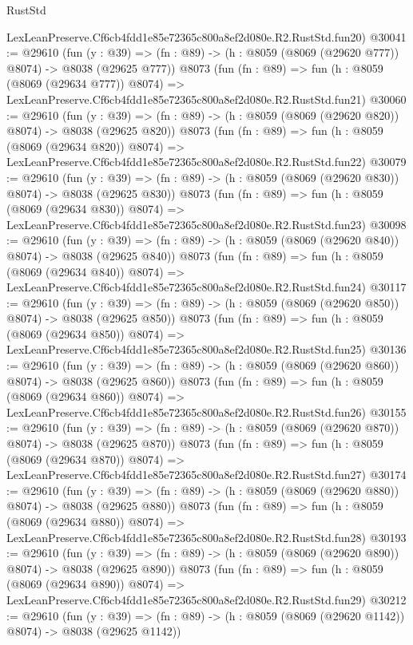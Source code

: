 \begin{lexlean}{RustStd}
\begin{coremodule}
    LexLeanPreserve.Cf6cb4fdd1e85e72365c800a8ef2d080e.R2.RustStd.fun20)
@30041 := @29610
    (fun (y : @39) => (fn : @89) -> (h : @8059 (@8069 (@29620 @777)) @8074) -> @8038 (@29625 @777))
    @8073
    (fun (fn : @89) =>
    fun (h : @8059 (@8069 (@29634 @777)) @8074) =>
    LexLeanPreserve.Cf6cb4fdd1e85e72365c800a8ef2d080e.R2.RustStd.fun21)
@30060 := @29610
    (fun (y : @39) => (fn : @89) -> (h : @8059 (@8069 (@29620 @820)) @8074) -> @8038 (@29625 @820))
    @8073
    (fun (fn : @89) =>
    fun (h : @8059 (@8069 (@29634 @820)) @8074) =>
    LexLeanPreserve.Cf6cb4fdd1e85e72365c800a8ef2d080e.R2.RustStd.fun22)
@30079 := @29610
    (fun (y : @39) => (fn : @89) -> (h : @8059 (@8069 (@29620 @830)) @8074) -> @8038 (@29625 @830))
    @8073
    (fun (fn : @89) =>
    fun (h : @8059 (@8069 (@29634 @830)) @8074) =>
    LexLeanPreserve.Cf6cb4fdd1e85e72365c800a8ef2d080e.R2.RustStd.fun23)
@30098 := @29610
    (fun (y : @39) => (fn : @89) -> (h : @8059 (@8069 (@29620 @840)) @8074) -> @8038 (@29625 @840))
    @8073
    (fun (fn : @89) =>
    fun (h : @8059 (@8069 (@29634 @840)) @8074) =>
    LexLeanPreserve.Cf6cb4fdd1e85e72365c800a8ef2d080e.R2.RustStd.fun24)
@30117 := @29610
    (fun (y : @39) => (fn : @89) -> (h : @8059 (@8069 (@29620 @850)) @8074) -> @8038 (@29625 @850))
    @8073
    (fun (fn : @89) =>
    fun (h : @8059 (@8069 (@29634 @850)) @8074) =>
    LexLeanPreserve.Cf6cb4fdd1e85e72365c800a8ef2d080e.R2.RustStd.fun25)
@30136 := @29610
    (fun (y : @39) => (fn : @89) -> (h : @8059 (@8069 (@29620 @860)) @8074) -> @8038 (@29625 @860))
    @8073
    (fun (fn : @89) =>
    fun (h : @8059 (@8069 (@29634 @860)) @8074) =>
    LexLeanPreserve.Cf6cb4fdd1e85e72365c800a8ef2d080e.R2.RustStd.fun26)
@30155 := @29610
    (fun (y : @39) => (fn : @89) -> (h : @8059 (@8069 (@29620 @870)) @8074) -> @8038 (@29625 @870))
    @8073
    (fun (fn : @89) =>
    fun (h : @8059 (@8069 (@29634 @870)) @8074) =>
    LexLeanPreserve.Cf6cb4fdd1e85e72365c800a8ef2d080e.R2.RustStd.fun27)
@30174 := @29610
    (fun (y : @39) => (fn : @89) -> (h : @8059 (@8069 (@29620 @880)) @8074) -> @8038 (@29625 @880))
    @8073
    (fun (fn : @89) =>
    fun (h : @8059 (@8069 (@29634 @880)) @8074) =>
    LexLeanPreserve.Cf6cb4fdd1e85e72365c800a8ef2d080e.R2.RustStd.fun28)
@30193 := @29610
    (fun (y : @39) => (fn : @89) -> (h : @8059 (@8069 (@29620 @890)) @8074) -> @8038 (@29625 @890))
    @8073
    (fun (fn : @89) =>
    fun (h : @8059 (@8069 (@29634 @890)) @8074) =>
    LexLeanPreserve.Cf6cb4fdd1e85e72365c800a8ef2d080e.R2.RustStd.fun29)
@30212 := @29610
    (fun (y : @39) =>
    (fn : @89) -> (h : @8059 (@8069 (@29620 @1142)) @8074) -> @8038 (@29625 @1142))

\end{coremodule}
\end{lexlean}
